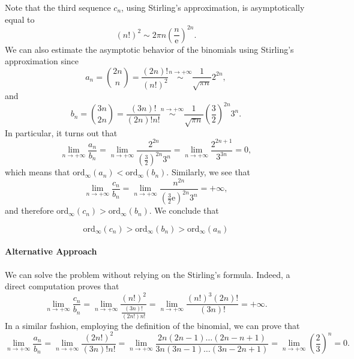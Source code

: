 \documentclass[a4paper,10 pt]{report}
\newcommand{\finalanswer}[1]{%
    \begin{finalAnswer}
    \[
        #1
    \]
    \end{finalAnswer}
}
\theoremstyle{definition}
\begin{document}
\begin{solutionBox} Note that the third sequence $c_n$, using Stirling's approximation, is asymptotically equal to
\begin{equation*} (n!)^2 \sim 2 \pi n \left( \frac{n}{\mathrm{e}} \right)^{2n}. \end{equation*}
We can also estimate the asymptotic behavior of the binomials using Stirling's approximation since
\begin{equation*} a_n = \binom{2n}{n} = \frac{(2n)!}{(n!)^2} \stackrel{n \to + \infty}{\sim} \frac{1}{\sqrt{\pi n}} 2^{2n}, \end{equation*}
and
\begin{equation*} b_n = \binom{3n}{2n} = \frac{(3n)!}{(2n)! n!} \stackrel{n \to + \infty}{\sim} \frac{1}{\sqrt{\pi n}} \left( \frac{3}{2} \right)^{2n} 3^n. \end{equation*}
In particular, it turns out that
\begin{equation*} \lim_{n \to + \infty} \frac{a_n}{b_n} = \lim_{n \to + \infty} \frac{2^{2n}}{\left( \frac{3}{2} \right)^{2n} 3^n} = \lim_{n \to + \infty} \frac{2^{2n+1}}{3^{3n}} = 0,  \end{equation*}
which means that $\mathrm{ord}_\infty(a_n) < \mathrm{ord}_\infty(b_n)$. Similarly, we see that
\begin{equation*} \lim_{n \to + \infty} \frac{c_n}{b_n} = \lim_{n \to + \infty} \frac{n^{2n}}{\left( \frac{3}{2} \mathrm{e} \right)^{2n} 3^n} = + \infty,  \end{equation*}
and therefore $\mathrm{ord}_\infty(c_n) > \mathrm{ord}_\infty(b_n)$. We conclude that
\finalanswer{\mathrm{ord}_\infty(c_n) > \mathrm{ord}_\infty(b_n) > \mathrm{ord}_\infty(a_n)}

\paragraph{Alternative Approach} We can solve the problem without relying on the Stirling's formula. Indeed, a direct computation proves that
\begin{equation*} \lim_{n \to + \infty} \frac{c_n}{b_n} = \lim_{n\to+\infty} \frac{ (n!)^2 }{ \frac{(3n)!}{(2n!)n!} } = \lim_{n \to + \infty} \frac{ (n!)^3 (2n)! }{(3n)!} = + \infty. \end{equation*}
In a similar fashion, employing the definition of the binomial, we can prove that
\begin{equation*} \lim_{n \to + \infty} \frac{a_n}{b_n} = \lim_{n\to+\infty} \frac{ (2n!)^2 }{ (3n)!n! } = \lim_{n \to + \infty} \frac{ 2n(2n - 1) \dots (2n - n + 1)}{3n(3n - 1) \dots (3n - 2n + 1)} = \lim_{n \to + \infty} \left(\frac{2}{3} \right)^n = 0. \end{equation*}
\end{solutionBox}
\end{document}

